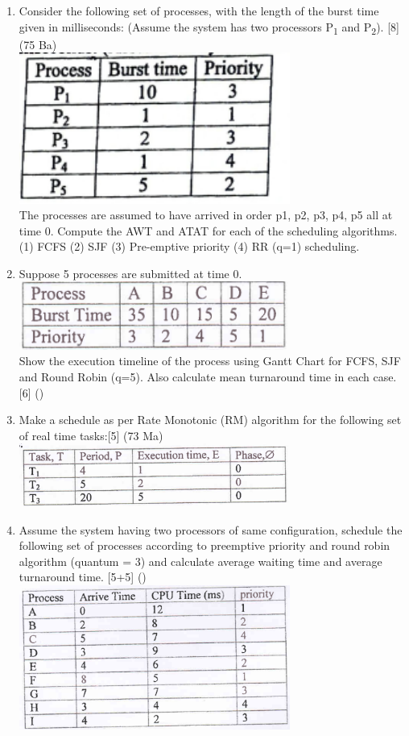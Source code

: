 \documentclass[12pt]{article}
\newcommand{\sub}[1]{\textsubscript{#1}}
\begin{document}
\begin{enumerate}
			\item Consider the following set of processes, with the length of the burst time given in milliseconds: (Assume the system has two processors P\sub{1} and P\sub{2}). \hfill [8] (75 Ba)\\
			\includegraphics[width=3.5in]{./pics/os_12}\\
			The processes are assumed to have arrived in order p1, p2, p3, p4, p5 all at time 0. Compute the AWT and ATAT for each of the scheduling algorithms. (1) FCFS (2) SJF (3) Pre-emptive priority (4) RR (q=1) scheduling.
			
			\item Suppose 5 processes are submitted at time 0.\\
			\includegraphics[width=3.5in]{./pics/os_13}\\
			Show the execution timeline of the process using Gantt Chart for FCFS, SJF and Round Robin (q=5). Also calculate mean turnaround time in each case. \hfill [6] ()
			
			\item Make a schedule as per Rate Monotonic (RM) algorithm for the following set of real time tasks:\hfill [5] (73 Ma)\\
			\includegraphics[width=3.5in]{./pics/os_14}
			
			\item Assume the system having two processors of same configuration, schedule the following set of processes according to preemptive priority and round robin algorithm (quantum = 3) and calculate average waiting time and average turnaround time. \hfill [5+5] ()
			\includegraphics[width=3.5in]{./pics/os_15}
			

\end{enumerate}
\end{document}

